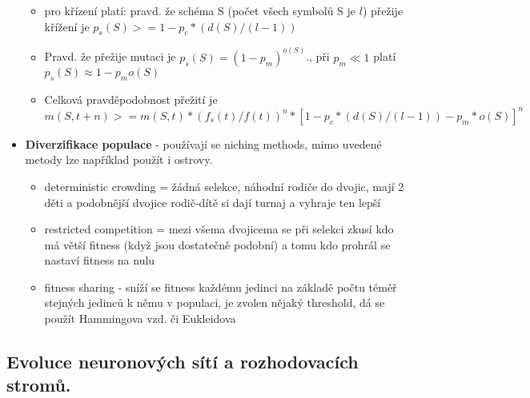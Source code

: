 \documentclass[a4paper,hidelinks]{article}
\begin{document}
\begin{itemize}
\begin{itemize}
            \item pro křízení platí: pravd. že schéma S (počet všech symbolů S je $l$) přežije křížení je $p_s(S)>=1-p_c*(d(S)/(l-1))$
            \item Pravd. že přežije mutaci je $p_s(S)=(1-p_m)^{o(S)}$., při $p_m \ll 1$ platí $p_s(S)\approx1-p_mo(S)$
            \item Celková pravděpodobnost přežití je $m(S,t+n)>=m(S,t)*(f_s(t)/f(t))^n*[1-p_c*(d(S)/(l-1))-p_m*o(S)]^n$
        \end{itemize}
    \item \textbf{Diverzifikace populace} - používají se niching methods, mimo uvedené metody lze například použít i ostrovy.
        \begin{itemize}
            \item deterministic crowding = žádná selekce, náhodní rodiče do dvojic, mají 2 děti a podobnější dvojice rodič-dítě si dají turnaj a vyhraje ten lepší
            \item restricted competition = mezi všema dvojicema se při selekci zkusí kdo má větší fitness (když jsou dostatečně podobní) a tomu kdo prohrál se nastaví fitness na nulu
            \item fitness sharing - sníží se fitness každému jedinci na základě počtu téměř stejných jedinců k němu v populaci, je zvolen nějaký threshold, dá se použít Hammingova vzd. či Eukleidova
        \end{itemize}
\end{itemize}


\subsection{Evoluce neuronových sítí a rozhodovacích stromů.}
\end{document}
